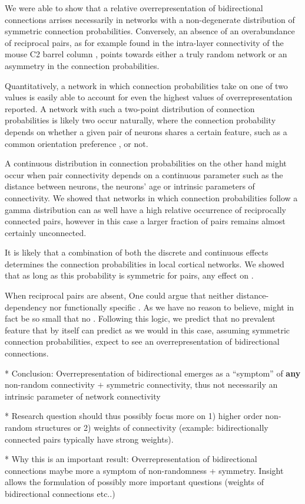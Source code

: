
We were able to show that a relative overrepresentation of bidirectional connections arrises necessarily in networks with a non-degenerate distribution of symmetric connection probabilities. Conversely, an absence of an overabundance of reciprocal pairs, as for example found in the intra-layer connectivity of the mouse C2 barrel column \cite{Lefort2009}, points towards either a truly random network or an asymmetry in the connection probabilities. 

Quantitatively, a network in which connection probabilities take on one of two values is easily able to account for even the highest values of overrepresentation reported. A network with such a two-point distribution of connection probabilities is likely two occur naturally, where the connection probability depends on whether a given pair of neurons shares a certain feature, such as a common orientation preference \cite{Lee2016}, or not. 

A continuous distribution in connection probabilities on the other hand might occur when pair connectivity depends on a continuous parameter such as the distance between neurons, the neurons' age or intrinsic parameters of connectivity. We showed that networks in which connection probabilities follow a gamma distribution can as well have a high relative occurrence of reciprocally connected pairs, however in this case a larger fraction of pairs remains almost certainly unconnected.

It is likely that a combination of both the discrete and continuous effects determines the connection probabilities in local cortical networks. We showed that as long as this probability is symmetric for pairs, any effect on .

When reciprocal pairs are absent, One could argue that neither distance-dependency nor functionally specific . As we have no reason to believe, might in fact be so small that no . Following this logic, we predict that no prevalent feature that by itself can predict as we would in this case, assuming symmetric connection probabilities, expect to see an overrepresentation of bidirectional connections.




* Conclusion: Overrepresentation of bidirectional emerges as a \enquote{symptom} of \textbf{any} non-random connectivity $+$ symmetric connectivity, thus not necessarily an intrinsic parameter of network connectivity

* Research question should thus possibly focus more on 1) higher order non-random structures or 2) weights of connectivity (example: bidirectionally connected pairs typically have strong weights). 


* Why this is an important result: Overrepresentation of bidirectional connections maybe more a symptom of non-randomness + symmetry. Insight allows the formulation of possibly more important questions (weights of bidirectional connections etc..)
